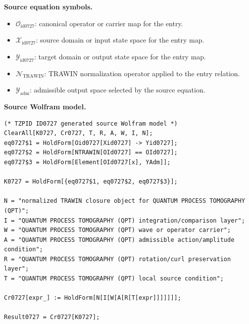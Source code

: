 \begin{minipage}[t]{0.49\linewidth}
\begingroup
\small
\raggedright
\textbf{Source equation symbols.}\par
\begin{itemize}[leftmargin=1.35em,itemsep=1pt,topsep=1pt,parsep=0pt]
    \item $\mathcal{O}_{\mathrm{id0727}}$: canonical operator or carrier map for the entry.
    \item $\mathcal{X}_{\mathrm{id0727}}$: source domain or input state space for the entry map.
    \item $\mathcal{Y}_{\mathrm{id0727}}$: target domain or output state space for the entry map.
    \item $\mathcal{N}_{\mathrm{TRAWIN}}$: TRAWIN normalization operator applied to the entry relation.
    \item $\mathcal{Y}_{\mathrm{adm}}$: admissible output space selected by the source equation.
\end{itemize}
\endgroup
\end{minipage}\hfill
\begin{minipage}[t]{0.47\linewidth}
\begingroup
\scriptsize
\raggedright
\textbf{Source Wolfram model.}\par
\begin{Verbatim}[fontsize=\tiny,breaklines=true,breakanywhere=true]
(* TZPID ID0727 generated source Wolfram model *)
ClearAll[K0727, Cr0727, T, R, A, W, I, N];
eq0727$1 = HoldForm[Oid0727[Xid0727] -> Yid0727];
eq0727$2 = HoldForm[NTRAWIN[OId0727] == OId0727];
eq0727$3 = HoldForm[Element[OId0727[x], YAdm]];

K0727 = HoldForm[{eq0727$1, eq0727$2, eq0727$3}];

N = "normalized TRAWIN closure object for QUANTUM PROCESS TOMOGRAPHY (QPT)";
I = "QUANTUM PROCESS TOMOGRAPHY (QPT) integration/comparison layer";
W = "QUANTUM PROCESS TOMOGRAPHY (QPT) wave or operator carrier";
A = "QUANTUM PROCESS TOMOGRAPHY (QPT) admissible action/amplitude condition";
R = "QUANTUM PROCESS TOMOGRAPHY (QPT) rotation/curl preservation layer";
T = "QUANTUM PROCESS TOMOGRAPHY (QPT) local source condition";

Cr0727[expr_] := HoldForm[N[I[W[A[R[T[expr]]]]]]];

Result0727 = Cr0727[K0727];
\end{Verbatim}
\endgroup
\end{minipage}

